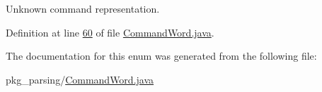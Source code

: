 Unknown command representation. 



Definition at line \hyperlink{CommandWord_8java_source_l00060}{60} of file \hyperlink{CommandWord_8java_source}{Command\-Word.\-java}.



The documentation for this enum was generated from the following file\-:\begin{DoxyCompactItemize}
\item 
pkg\-\_\-parsing/\hyperlink{CommandWord_8java}{Command\-Word.\-java}\end{DoxyCompactItemize}

